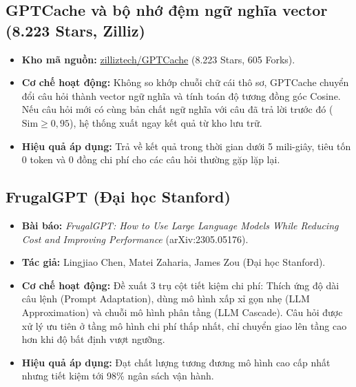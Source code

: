 \documentclass[12pt,a4paper]{article}
\begin{document}
\subsection{GPTCache và bộ nhớ đệm ngữ nghĩa vector (8.223 Stars, Zilliz)}
\begin{itemize}[leftmargin=1.5em]
    \item \textbf{Kho mã nguồn:} \href{https://github.com/zilliztech/GPTCache}{zilliztech/GPTCache} (8.223 Stars, 605 Forks).
    \item \textbf{Cơ chế hoạt động:} Không so khớp chuỗi chữ cái thô sơ, GPTCache chuyển đổi câu hỏi thành vector ngữ nghĩa và tính toán độ tương đồng góc Cosine. Nếu câu hỏi mới có cùng bản chất ngữ nghĩa với câu đã trả lời trước đó ($\text{Sim} \ge 0,95$), hệ thống xuất ngay kết quả từ kho lưu trữ.
    \item \textbf{Hiệu quả áp dụng:} Trả về kết quả trong thời gian dưới 5 mili-giây, tiêu tốn 0 token và 0 đồng chi phí cho các câu hỏi thường gặp lặp lại.
\end{itemize}

\subsection{FrugalGPT (Đại học Stanford)}
\begin{itemize}[leftmargin=1.5em]
    \item \textbf{Bài báo:} \textit{FrugalGPT: How to Use Large Language Models While Reducing Cost and Improving Performance} (arXiv:2305.05176).
    \item \textbf{Tác giả:} Lingjiao Chen, Matei Zaharia, James Zou (Đại học Stanford).
    \item \textbf{Cơ chế hoạt động:} Đề xuất 3 trụ cột tiết kiệm chi phí: Thích ứng độ dài câu lệnh (Prompt Adaptation), dùng mô hình xấp xỉ gọn nhẹ (LLM Approximation) và chuỗi mô hình phân tầng (LLM Cascade). Câu hỏi được xử lý ưu tiên ở tầng mô hình chi phí thấp nhất, chỉ chuyển giao lên tầng cao hơn khi độ bất định vượt ngưỡng.
    \item \textbf{Hiệu quả áp dụng:} Đạt chất lượng tương đương mô hình cao cấp nhất nhưng tiết kiệm tới 98\% ngân sách vận hành.
\end{itemize}
\end{document}
